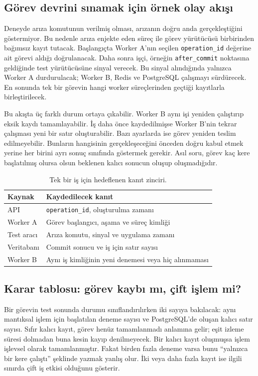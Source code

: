 \documentclass[conference,a4paper]{IEEEtran}
\newcommand{\code}[1]{\texttt{#1}}
\begin{document}
\subsection{Görev devrini sınamak için örnek olay akışı}
Deneyde arıza komutunun verilmiş olması, arızanın doğru anda gerçekleştiğini göstermiyor. Bu nedenle arıza enjekte eden süreç ile görev yürütücüsü birbirinden bağımsız kayıt tutacak. Başlangıçta Worker A'nın seçilen \code{operation\_id} değerine ait görevi aldığı doğrulanacak. Daha sonra işçi, örneğin \code{after\_commit} noktasına geldiğinde test yürütücüsüne sinyal verecek. Bu sinyal alındığında yalnızca Worker A durdurulacak; Worker B, Redis ve PostgreSQL çalışmayı sürdürecek. En sonunda tek bir görevin hangi worker süreçlerinden geçtiği kayıtlarla birleştirilecek.

Bu akışta üç farklı durum ortaya çıkabilir. Worker B aynı işi yeniden çalıştırıp eksik kaydı tamamlayabilir. İş daha önce kaydedilmişse Worker B'nin tekrar çalışması yeni bir satır oluşturabilir. Bazı ayarlarda ise görev yeniden teslim edilmeyebilir. Bunların hangisinin gerçekleşeceğini önceden doğru kabul etmek yerine her birini ayrı sonuç sınıfında göstermek gerekir. Asıl soru, görev kaç kere başlatılmış olursa olsun beklenen kalıcı sonucun oluşup oluşmadığıdır.

\begin{table}[t]
\caption{Tek bir iş için hedeflenen kanıt zinciri.}
\centering\footnotesize
\begin{tabularx}{\columnwidth}{@{}p{12mm}X@{}}
\toprule
Kaynak & Kaydedilecek kanıt\\
\midrule
API & \code{operation\_id}, oluşturulma zamanı\\
Worker A & Görev başlangıcı, aşama ve süreç kimliği\\
Test aracı & Arıza komutu, sinyal ve uygulama zamanı\\
Veritabanı & Commit sonucu ve iş için satır sayısı\\
Worker B & Aynı iş kimliğinin yeni denemesi veya hiç alınmaması\\
\bottomrule
\end{tabularx}
\label{tab:trace}
\end{table}

\subsection{Karar tablosu: görev kaybı mı, çift işlem mi?}
Bir görevin test sonunda durumu sınıflandırılırken iki sayıya bakılacak: aynı mantıksal işlem için başlatılan deneme sayısı ve PostgreSQL'de oluşan kalıcı satır sayısı. Sıfır kalıcı kayıt, görev henüz tamamlanmadı anlamına gelir; eşit izleme süresi dolmadan buna kesin kayıp denilmeyecek. Bir kalıcı kayıt oluşmuşsa işlem işlevsel olarak tamamlanmıştır. Fakat birden fazla deneme varsa bunu ``yalnızca bir kere çalıştı'' şeklinde yazmak yanlış olur. İki veya daha fazla kayıt ise ilgili sınırda çift iş etkisi olduğunu gösterir.
\end{document}
